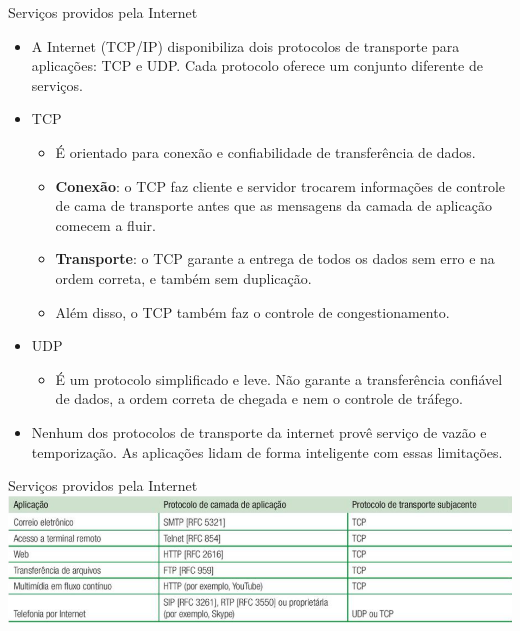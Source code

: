 \documentclass{libs/ufc_format}
\begin{document}
\begin{frame}{Serviços providos pela Internet}
    \begin{itemize}
        \justifying
        \item A Internet (TCP/IP) disponibiliza dois protocolos de transporte para aplicações: TCP e UDP. Cada protocolo oferece um conjunto diferente de serviços.
        \item TCP
            \begin{itemize}
                \justifying
                \item<2> É orientado para conexão e confiabilidade de transferência de dados.
                \item<2> \textbf{Conexão}: o TCP faz cliente e servidor trocarem informações de controle de cama de transporte \alert<2>{antes} que as mensagens da camada de aplicação comecem a fluir.
                \item<2> \textbf{Transporte}: o TCP garante a entrega de todos os dados sem erro e na ordem correta, e também sem duplicação.
                \item<2> Além disso, o TCP também faz o controle de congestionamento.
            \end{itemize}
        \item UDP
            \begin{itemize}
                \justifying
                \item<3> É um protocolo simplificado e leve. Não garante a transferência confiável de dados, a ordem correta de chegada e nem o controle de tráfego.
            \end{itemize}
        \item<4> Nenhum dos protocolos de transporte da internet provê serviço de vazão e temporização. As aplicações lidam de forma inteligente com essas limitações.
    \end{itemize}
\end{frame}

\begin{frame}{Serviços providos pela Internet}
    \includegraphics[width=\textwidth]{figuras/figura03_02}
\end{frame}
\end{document}

